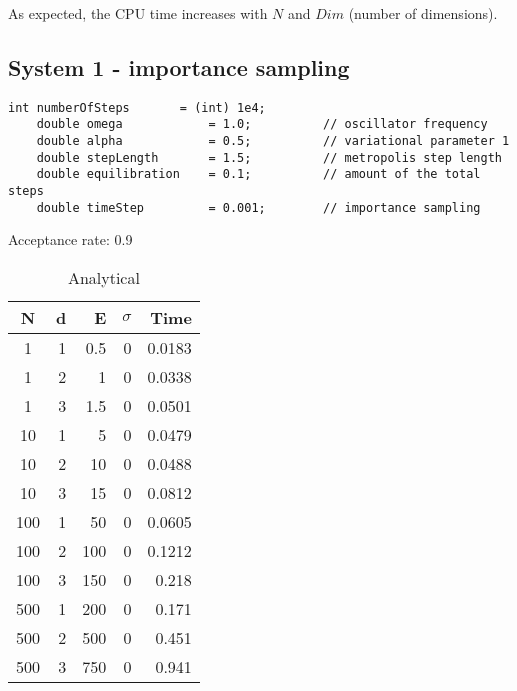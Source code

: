 \documentclass[english, a4paper]{article}
\begin{document}
As expected, the CPU time increases with $N$ and $Dim$ (number of dimensions).




\subsection{System 1 - importance sampling}

\belowcaptionskip=-10pt
\begin{lstlisting}[label=parameters2,caption=Parameters importance sampling Metropolis system 1]
    int numberOfSteps       = (int) 1e4;
    double omega            = 1.0;          // oscillator frequency
    double alpha            = 0.5;          // variational parameter 1
    double stepLength       = 1.5;          // metropolis step length
    double equilibration    = 0.1;          // amount of the total steps
    double timeStep         = 0.001;        // importance sampling
\end{lstlisting}

Acceptance rate: 0.9

\begin{table}[H]
  \centering
  \begin{tabular}{ | c | r | r | r | r |}
    \hline
    N& d& E& $\sigma$& Time \\*
    \hline
    1& 1& 0.5& 0& 0.0183 \\*
    \hline
    1& 2& 1& 0&  0.0338\\*
    \hline
    1& 3& 1.5& 0&  0.0501\\*
    \hline
    10& 1& 5& 0&  0.0479\\*
    \hline
    10& 2& 10& 0&  0.0488\\*
    \hline
    10& 3& 15& 0&  0.0812\\*
    \hline
    100& 1& 50& 0&  0.0605\\*
    \hline
    100& 2& 100& 0&  0.1212\\*
    \hline
    100& 3& 150& 0&  0.218\\*
    \hline
    500& 1& 200& 0&  0.171\\*
    \hline
    500& 2& 500& 0&  0.451\\*
    \hline
    500& 3& 750& 0&  0.941\\*
    \hline
  \end{tabular}
  \caption{Analytical}
  \label{tab:Tabell1}
\end{table}
\end{document}
